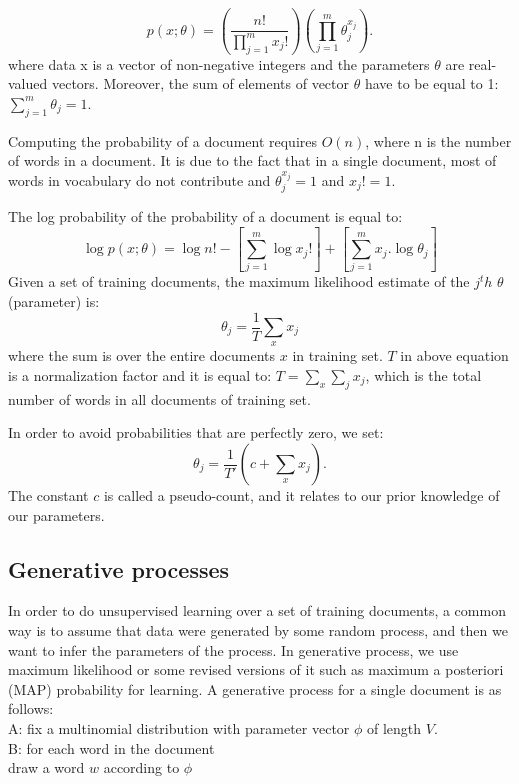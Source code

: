 \documentclass[twoside,12pt]{article}
\begin{document}
\begin{equation}
p(x;\theta)=(\frac{n!}{\prod_{j=1}^{m}x_j!})(\prod_{j=1}^{m}\theta_j^{x_j}).
\end{equation}
where data x is a vector of non-negative integers and the parameters $\theta$ are real-valued vectors. Moreover, the sum of elements of vector $\theta$ have to be equal to 1: $\sum_{j=1}^{m}\theta_j=1$.

Computing the probability of a document requires $O(n)$, where n is the number of words in a document. It is due to the fact that in a single document, most of words in vocabulary do not contribute and $\theta_j^{x_j}=1$ and $x_j!=1$.

The log probability of the probability of a document is equal to:
\begin{equation}
\log p(x;\theta)=\log n!-[\sum_{j=1}^m\log x_j!]+[\sum_{j=1}^m x_j.\log \theta_j]
\end{equation}
Given a set of training documents, the maximum likelihood estimate of the $j^th$ $\theta$ (parameter) is:
\begin{equation}
\theta_j = \frac{1}{T}\sum_x x_j
\end{equation}
where the sum is over the entire documents $x$ in training set. $T$ in above equation is a normalization factor and it is equal to: $T=\sum_x \sum_j x_j$, which is the total number of words in all documents of training set. 

In order to avoid probabilities that are perfectly zero, we set:
\begin{equation}
\theta_j=\frac{1}{T'}(c+\sum_x x_j).
\end{equation}
The constant $c$ is called a pseudo-count, and it relates to our prior knowledge of our parameters.
 
\subsection{ Generative processes}
In order to do unsupervised learning over a set of training documents, a common way is to assume that data were generated by some random process, and then we want to infer the parameters of the process. In generative process, we use maximum likelihood or some revised versions of it such as maximum a posteriori (MAP) probability for learning. A generative process for a single document is as follows: \\
A: fix a multinomial distribution with parameter vector $\phi$ of length $V$. \\
B: for each word in the document \\
draw a word $w$ according to $\phi$ 
\end{document}
